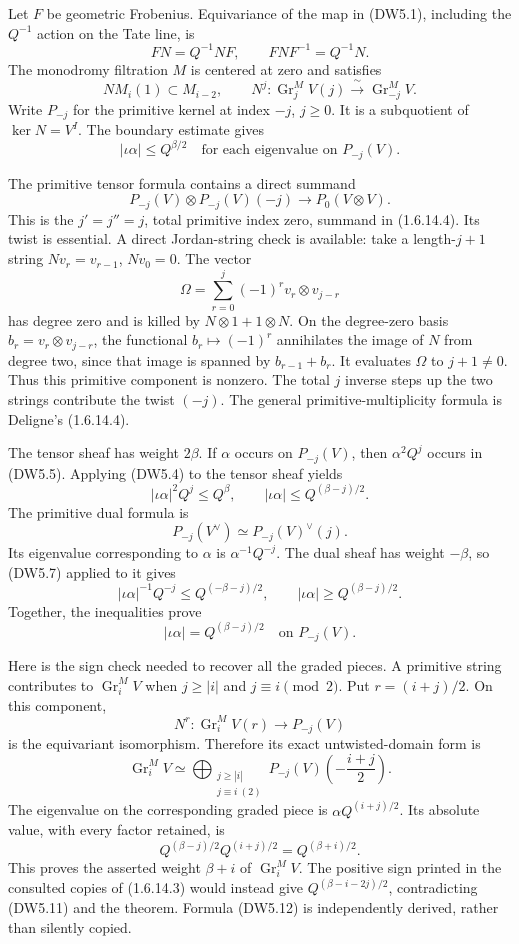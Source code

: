 Let \(F\) be geometric Frobenius. Equivariance of the map in (DW5.1),
including the \(Q^{-1}\) action on the Tate line, is \[
FN=Q^{-1}NF,\qquad FNF^{-1}=Q^{-1}N.
\tag{DW5.2}
\] The monodromy filtration \(M\) is centered at zero and satisfies \[
N M_i(1)\subset M_{i-2},
\qquad
N^j:\operatorname{Gr}_j^M V(j)
\xrightarrow{\;\sim\;}\operatorname{Gr}_{-j}^M V.
\tag{DW5.3}
\] Write \(P_{-j}\) for the primitive kernel at index \(-j\), \(j\ge0\).
It is a subquotient of \(\ker N=V^I\). The boundary estimate gives \[
|\iota\alpha|\le Q^{\beta/2}
\quad\text{for each eigenvalue on }P_{-j}(V).
\tag{DW5.4}
\]

The primitive tensor formula contains a direct summand \[
P_{-j}(V)\otimes P_{-j}(V)(-j)
\longrightarrow P_0(V\otimes V).
\tag{DW5.5}
\] This is the \(j'=j''=j\), total primitive index zero, summand in
(1.6.14.4). Its twist is essential. A direct Jordan-string check is
available: take a length-\(j+1\) string \(Nv_r=v_{r-1}\), \(Nv_0=0\).
The vector \[
\Omega=\sum_{r=0}^j(-1)^r v_r\otimes v_{j-r}
\tag{DW5.6}
\] has degree zero and is killed by \(N\otimes1+1\otimes N\). On the
degree-zero basis \(b_r=v_r\otimes v_{j-r}\), the functional
\(b_r\mapsto(-1)^r\) annihilates the image of \(N\) from degree two,
since that image is spanned by \(b_{r-1}+b_r\). It evaluates \(\Omega\)
to \(j+1\ne0\). Thus this primitive component is nonzero. The total
\(j\) inverse steps up the two strings contribute the twist \((-j)\).
The general primitive-multiplicity formula is Deligne's (1.6.14.4).

The tensor sheaf has weight \(2\beta\). If \(\alpha\) occurs on
\(P_{-j}(V)\), then \(\alpha^2Q^j\) occurs in (DW5.5). Applying (DW5.4)
to the tensor sheaf yields \[
|\iota\alpha|^2Q^j\le Q^\beta,
\qquad
|\iota\alpha|\le Q^{(\beta-j)/2}.
\tag{DW5.7}
\] The primitive dual formula is \[
P_{-j}(V^\vee)\simeq P_{-j}(V)^\vee(j).
\tag{DW5.8}
\] Its eigenvalue corresponding to \(\alpha\) is \(\alpha^{-1}Q^{-j}\).
The dual sheaf has weight \(-\beta\), so (DW5.7) applied to it gives \[
|\iota\alpha|^{-1}Q^{-j}\le Q^{(-\beta-j)/2},
\qquad
|\iota\alpha|\ge Q^{(\beta-j)/2}.
\tag{DW5.9}
\] Together, the inequalities prove \[
|\iota\alpha|=Q^{(\beta-j)/2}
\quad\text{on }P_{-j}(V).
\tag{DW5.10}
\]

Here is the sign check needed to recover all the graded pieces. A
primitive string contributes to \(\operatorname{Gr}_i^M V\) when
\(j\ge|i|\) and \(j\equiv i\pmod2\). Put \(r=(i+j)/2\). On this
component, \[
N^r:\operatorname{Gr}_i^M V(r)\longrightarrow P_{-j}(V)
\tag{DW5.11}
\] is the equivariant isomorphism. Therefore its exact untwisted-domain
form is \[
\operatorname{Gr}_i^M V
\simeq
\bigoplus_{\substack{j\ge|i|\\j\equiv i\ (2)}}
P_{-j}(V)\left(-\frac{i+j}{2}\right).
\tag{DW5.12}
\] The eigenvalue on the corresponding graded piece is
\(\alpha Q^{(i+j)/2}\). Its absolute value, with every factor retained,
is \[
Q^{(\beta-j)/2}Q^{(i+j)/2}
=Q^{(\beta+i)/2}.
\tag{DW5.13}
\] This proves the asserted weight \(\beta+i\) of
\(\operatorname{Gr}_i^M V\). The positive sign printed in the consulted
copies of (1.6.14.3) would instead give \(Q^{(\beta-i-2j)/2}\),
contradicting (DW5.11) and the theorem. Formula (DW5.12) is
independently derived, rather than silently copied.

